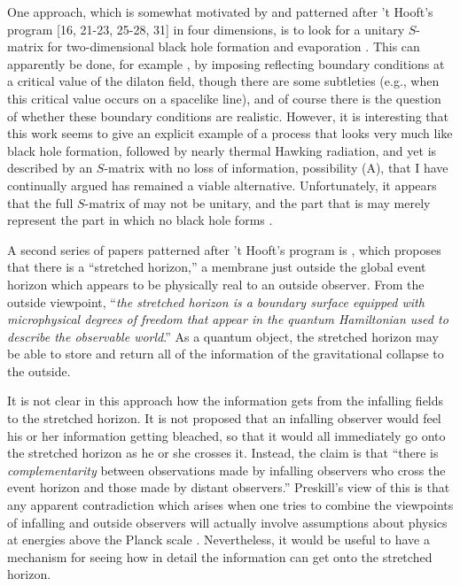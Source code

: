 \documentclass[12pt]{article}
\begin{document}
     One approach, which is somewhat motivated by and patterned after
't Hooft's program
[16, 21-23, 25-28, 31]
in four dimensions, is to look for a unitary
$S$-matrix for two-dimensional black hole formation and evaporation
\cite{Mik,Ver93,Sch93,Rus93,Mik93}.  This can apparently be done,
for example \cite{Ver93,Sch93}, by imposing reflecting
boundary conditions at a critical value of the dilaton field, though
there are
some subtleties (e.g., when this critical value occurs on a spacelike
line),
and of course there is the question of whether these boundary
conditions are
realistic.  However, it is interesting that this work seems to give
an explicit
example of a process that looks very much like black hole formation,
followed
by nearly thermal Hawking radiation, and yet is described by an
$S$-matrix with
no loss of information, possibility (A), that I have continually
argued has
remained a viable alternative.  Unfortunately, it appears that the
full $S$-matrix of \cite{Ver93,Sch93} may not be unitary, and the
part that
is may merely represent the part in which no black hole forms
\cite{Suspri}.

     A second series of papers patterned after 't Hooft's program is
\cite{STU,Sus,SusT},
which proposes that there is a ``stretched horizon,'' a membrane just
outside the global event horizon which appears to be physically real
to an outside observer.  From the outside viewpoint,
``{\it the stretched horizon is a boundary surface
equipped with microphysical degrees of freedom that appear in the
quantum Hamiltonian used to describe the observable world}.''
As a quantum object, the stretched horizon may be able to store and
return all of the information of the gravitational collapse to the
outside.

     It is not clear in this approach how the information gets from
the
infalling fields to the stretched horizon.  It is not proposed that
an
infalling observer would feel his or her information getting
bleached,
so that it would all immediately go onto the stretched horizon
as he or she crosses it.
Instead, the claim is that ``there is {\it complementarity\/}
between observations made by infalling observers who cross the
event horizon and those made by distant observers.''  Preskill's
view of this \cite{Prepri,Suspri} is that any apparent contradiction
which arises when one tries to combine the viewpoints of infalling
and outside observers will actually involve assumptions about
physics at energies above the Planck scale \cite{SusT}.
Nevertheless, it would be useful to have a mechanism for seeing
how in detail the information can get onto the stretched horizon.
\end{document}
